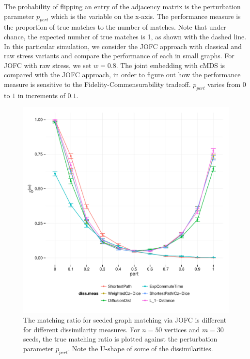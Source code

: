 \documentclass[12pt,oneside,final]{thesis}\usepackage[]{graphicx}\usepackage[]{color}
\makeatletter
\def\maxwidth{ %
  \ifdim\Gin@nat@width>\linewidth
    \linewidth
  \else
    \Gin@nat@width
  \fi
}
\newenvironment{knitrout}{}{} %
\makeatother
\begin{document}
  The probability of flipping an entry of the adjacency matrix is the perturbation parameter $p_{pert}$ which is the variable on the x-axis. 
  The performance measure is the proportion of true matches to the number of matches. Note that 
  under chance, the expected number of true matches is 1, as shown with the dashed line. In this particular simulation, we consider the JOFC approach with classical and raw stress variants and compare the performance of each in small graphs. For JOFC with raw stress, we set $w=0.8$. The joint embedding with cMDS is compared with  the JOFC approach, in order to figure out how the performance measure is sensitive to the Fidelity-Commensurability tradeoff. 
  $p_{pert}$ varies from $0$ to $1$ in increments of $0.1$.  
  



  

 








\begin{knitrout}
\color{fgcolor}\begin{figure}[]

\includegraphics[width=\maxwidth]{figure/JOFC_on_Graphs_Plot} \caption[The matching ratio for seeded graph matching via JOFC is different for different dissimilarity measures]{The matching ratio for seeded graph matching via JOFC is different for different dissimilarity measures. For $n=50$ vertices and $m=30$ seeds, the true matching ratio is plotted against the perturbation parameter $p_{pert}$. Note the U-shape of some of the dissimilarities.\label{fig:JOFC_on_Graphs_Plot}}
\end{figure}


\end{knitrout}
\end{document}
